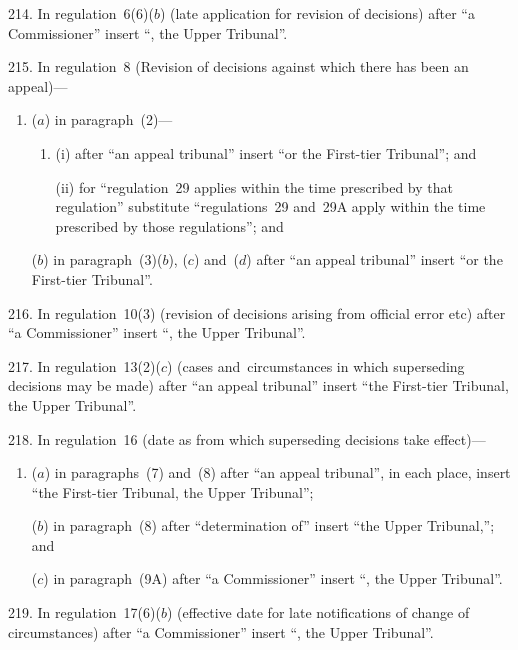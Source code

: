 \documentclass[12pt,a4paper]{article}
\begin{document}
\medskip

214.  In regulation~6(6)($b$)  (late application for revision of decisions) after “a Commissioner” insert “, the Upper Tribunal”.

\medskip

215.  In regulation~8 (Revision of decisions against which there has been an appeal)—
\begin{enumerate}\item[]
($a$) in paragraph~(2)—
\begin{enumerate}\item[]
(i) after “an appeal tribunal” insert “or the First-tier Tribunal”; and

(ii) for “regulation~29 applies within the time prescribed by that regulation” substitute “regulations~29 and~29A apply within the time prescribed by those regulations”; and
\end{enumerate}

($b$) in paragraph~(3)($b$), ($c$)  and~($d$)  after “an appeal tribunal” insert “or the First-tier Tribunal”.
\end{enumerate}

\medskip

216.  In regulation~10(3) (revision of decisions arising from official error etc) after “a Commissioner” insert “, the Upper Tribunal”.

\medskip

217.  In regulation~13(2)($c$)  (cases and~circumstances in which superseding decisions may be made) after “an appeal tribunal” insert “the First-tier Tribunal, the Upper Tribunal”.

\medskip

218.  In regulation~16 (date as from which superseding decisions take effect)—
\begin{enumerate}\item[]
($a$) in paragraphs~(7) and~(8) after “an appeal tribunal”, in each place, insert “the First-tier Tribunal, the Upper Tribunal”;

($b$) in paragraph~(8) after “determination of” insert “the Upper Tribunal,”; and

($c$) in paragraph~(9A) after “a Commissioner” insert “, the Upper Tribunal”.
\end{enumerate}

\medskip

219.  In regulation~17(6)($b$)  (effective date for late notifications of change of circumstances) after “a Commissioner” insert “, the Upper Tribunal”.
\end{document}
